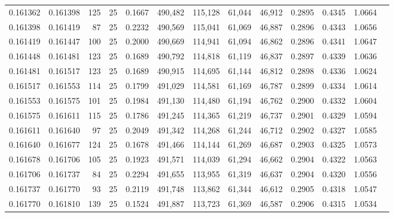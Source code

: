 \begin{tabular}{rrrrrrrrrrrrr}
0.161362 & 0.161398 &   125 &  25 &                                     0.1667 & 490,482 & 115,128 &  61,044 &  46,912 & 0.2895 & 0.4345 & 1.0664 \\
0.161398 & 0.161419 &    87 &  25 &                                     0.2232 & 490,569 & 115,041 &  61,069 &  46,887 & 0.2896 & 0.4343 & 1.0656 \\
0.161419 & 0.161447 &   100 &  25 &                                     0.2000 & 490,669 & 114,941 &  61,094 &  46,862 & 0.2896 & 0.4341 & 1.0647 \\
0.161448 & 0.161481 &   123 &  25 &                                     0.1689 & 490,792 & 114,818 &  61,119 &  46,837 & 0.2897 & 0.4339 & 1.0636 \\
0.161481 & 0.161517 &   123 &  25 &                                     0.1689 & 490,915 & 114,695 &  61,144 &  46,812 & 0.2898 & 0.4336 & 1.0624 \\
0.161517 & 0.161553 &   114 &  25 &                                     0.1799 & 491,029 & 114,581 &  61,169 &  46,787 & 0.2899 & 0.4334 & 1.0614 \\
0.161553 & 0.161575 &   101 &  25 &                                     0.1984 & 491,130 & 114,480 &  61,194 &  46,762 & 0.2900 & 0.4332 & 1.0604 \\
0.161575 & 0.161611 &   115 &  25 &                                     0.1786 & 491,245 & 114,365 &  61,219 &  46,737 & 0.2901 & 0.4329 & 1.0594 \\
0.161611 & 0.161640 &    97 &  25 &                                     0.2049 & 491,342 & 114,268 &  61,244 &  46,712 & 0.2902 & 0.4327 & 1.0585 \\
0.161640 & 0.161677 &   124 &  25 &                                     0.1678 & 491,466 & 114,144 &  61,269 &  46,687 & 0.2903 & 0.4325 & 1.0573 \\
0.161678 & 0.161706 &   105 &  25 &                                     0.1923 & 491,571 & 114,039 &  61,294 &  46,662 & 0.2904 & 0.4322 & 1.0563 \\
0.161706 & 0.161737 &    84 &  25 &                                     0.2294 & 491,655 & 113,955 &  61,319 &  46,637 & 0.2904 & 0.4320 & 1.0556 \\
0.161737 & 0.161770 &    93 &  25 &                                     0.2119 & 491,748 & 113,862 &  61,344 &  46,612 & 0.2905 & 0.4318 & 1.0547 \\
0.161770 & 0.161810 &   139 &  25 &                                     0.1524 & 491,887 & 113,723 &  61,369 &  46,587 & 0.2906 & 0.4315 & 1.0534 \\

\end{tabular}
